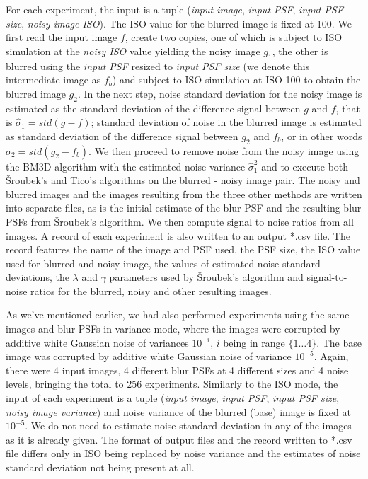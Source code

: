 \documentclass[12pt,notitlepage]{report}
\begin{document}
For each experiment, the input is a tuple ({\em input image}, {\em input PSF}, {\em input PSF size}, {\em noisy image ISO}). The ISO value for the blurred image is fixed at 100. We first read the input image $f$, create two copies, one of which is subject to ISO simulation at the {\em noisy ISO} value yielding the noisy image $g_1$, the other is blurred using the {\em input PSF} resized to {\em input PSF size} (we denote this intermediate image as $f_b$) and subject to ISO simulation at ISO 100 to obtain the blurred image $g_2$. In the next step, noise standard deviation for the noisy image is estimated as the standard deviation of the difference signal between $g$ and $f$, that is $\hat{\sigma}_1 = std(g - f)$; standard deviation of noise in the blurred image is estimated as standard deviation of the difference signal between $g_2$ and $f_b$, or in other words $\hat{\sigma}_2 = std(g_2 - f_b)$. We then proceed to remove noise from the noisy image using the BM3D algorithm with the estimated noise variance $\hat{\sigma}_1^2$ and to execute both Šroubek's and Tico's algorithms on the blurred - noisy image pair. The noisy and blurred images and the images resulting from the three other methods are written into separate files, as is the initial estimate of the blur PSF and the resulting blur PSFs from Šroubek's algorithm. We then compute signal to noise ratios from all images. A record of each experiment is also written to an output *.csv file. The record features the name of the image and PSF used, the PSF size, the ISO value used for blurred and noisy image, the values of estimated noise standard deviations, the $\lambda$ and $\gamma$ parameters used by Šroubek's algorithm and signal-to-noise ratios for the blurred, noisy and other resulting images.  

As we've mentioned earlier, we had also performed experiments using the same images and blur PSFs in variance mode, where the images were corrupted by additive white Gaussian noise of variances $10^{-i}$, $i$ being in range $\lbrace 1 \dots 4 \rbrace$. The base image was corrupted by additive white Gaussian noise of variance $10^{-5}$. Again, there were 4 input images, 4 different blur PSFs at 4 different sizes and 4 noise levels, bringing the total to 256 experiments. Similarly to the ISO mode, the input of each experiment is a tuple ({\em input image}, {\em input PSF}, {\em input PSF size}, {\em noisy image variance}) and noise variance of the blurred (base) image is fixed at $10^{-5}$. We do not need to estimate noise standard deviation in any of the images as it is already given. The format of output files and the record written to *.csv file differs only in ISO being replaced by noise variance and the estimates of noise standard deviation not being present at all. 
\end{document}

